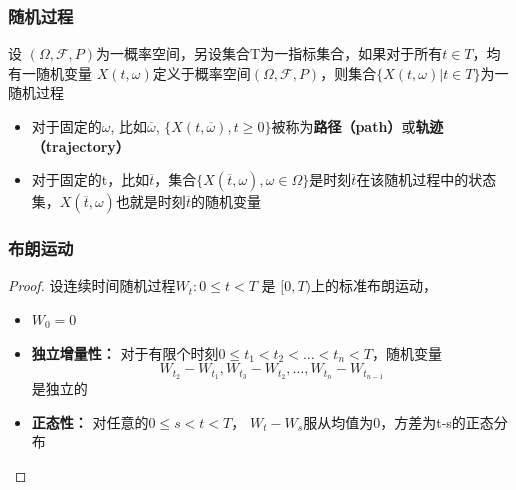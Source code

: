 \begin{frame}

\frametitle{随机过程}

\begin{definition}[随机过程]

设 $(\Omega ,{\mathcal  {F}},P)$为一概率空间，另设集合T为一指标集合，如果对于所有$t\in T$，均有一随机变量 $X(t,\omega)$定义于概率空间$(\Omega ,{\mathcal  {F}},P)$，则集合$\{X(t,\omega)|t\in T\}$为一随机过程

\begin{itemize}

\item 对于固定的$\omega$, 比如$\overline{\omega}$, $\{X(t,\overline{\omega}), t \geq 0\}$被称为\textbf{路径（path）}或\textbf{轨迹（trajectory）}

\item 对于固定的t，比如$\overline{t}$，集合$\{X(\overline{t},\omega), \omega \in \Omega\}$是时刻$\overline{t}$在该随机过程中的状态集，$X(\overline{t},\omega)$也就是时刻$\overline{t}$的随机变量


\end{itemize}

\end{definition}

\end{frame}

\begin{frame}

\frametitle{布朗运动}	

\begin{proof}

设连续时间随机过程$W_t: 0 \leq t < T$ 是 $[0,T)$上的标准布朗运动，

\begin{itemize}

\item $W_0 = 0$

\item \textbf{独立增量性：} 对于有限个时刻$0 \leq t_1 < t_2 < ... < t_n < T$，随机变量$$W_{t_2}-W_{t_1},W_{t_3}-W_{t_2},...,W_{t_n}-W_{t_{n-1}}$$是独立的

\item \textbf{正态性：} 对任意的$0 \leq s < t < T$， $W_t-W_s$服从均值为0，方差为t-s的正态分布

\end{itemize}

\end{proof}

\end{frame}

